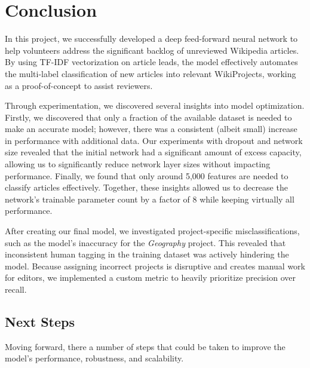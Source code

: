 \documentclass{article}
\begin{document}
\section{Conclusion}

In this project, we successfully developed a deep feed-forward neural network to help
volunteers address the significant backlog of unreviewed Wikipedia articles. By using TF-IDF
vectorization on article leads, the model effectively automates the multi-label classification
of new articles into relevant WikiProjects, working as a proof-of-concept to assist reviewers.

Through experimentation, we discovered several insights into model optimization. Firstly, we
discovered that only a fraction of the available dataset is needed to make an accurate model;
however, there was a consistent (albeit small) increase in performance with additional data.
Our experiments with dropout and network size revealed that the initial network had a
significant amount of excess capacity, allowing us to significantly reduce network layer sizes
without impacting performance. Finally, we found that only around 5,000 features are needed
to classify articles effectively. Together, these insights allowed us to decrease the network's
trainable parameter count by a factor of 8 while keeping virtually all performance.

After creating our final model, we investigated project-specific misclassifications, such as
the model's inaccuracy for the \textit{Geography} project. This revealed that inconsistent
human tagging in the training dataset was actively hindering the model. Because assigning
incorrect projects is disruptive and creates manual work for editors, we implemented a custom
metric to heavily prioritize precision over recall.

\subsection{Next Steps}

Moving forward, there a number of steps that could be taken to improve the model's performance,
robustness, and scalability.
\end{document}
